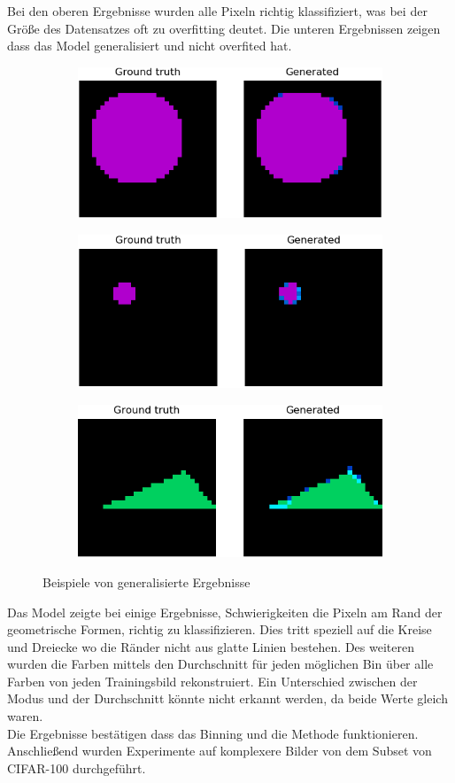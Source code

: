 Bei den oberen Ergebnisse wurden alle Pixeln richtig klassifiziert, was bei der Größe des Datensatzes oft zu overfitting deutet.
Die unteren Ergebnissen zeigen dass das Model generalisiert und nicht overfited hat.

\begin{figure}[H]
  \vspace{1cm}
  \begin{subfigure}
    \centering
    \includegraphics[width=.32\textwidth]{resources/experiments/581.png}
  \end{subfigure}
  \begin{subfigure}
    \centering
    \includegraphics[width=.32\textwidth]{resources/experiments/712.png}
  \end{subfigure}
  \begin{subfigure}
    \centering
    \includegraphics[width=.32\textwidth]{resources/experiments/761.png}
  \end{subfigure}
  \caption{Beispiele von generalisierte Ergebnisse}
  \label{image:nicht-gute-ergebnisse-toy-dataset}
\end{figure}

Das Model zeigte bei einige Ergebnisse, Schwierigkeiten die Pixeln am Rand der geometrische Formen, richtig zu klassifizieren.
Dies tritt speziell auf die Kreise und Dreiecke wo die Ränder nicht aus glatte Linien bestehen. Des weiteren wurden die Farben mittels
den Durchschnitt für jeden möglichen Bin über alle Farben von jeden Trainingsbild rekonstruiert. Ein Unterschied zwischen der Modus und der 
Durchschnitt könnte nicht erkannt werden, da beide Werte gleich waren.
\\
Die Ergebnisse bestätigen dass das Binning und die Methode funktionieren. Anschließend wurden Experimente auf komplexere Bilder
von dem Subset von CIFAR-100 durchgeführt.

